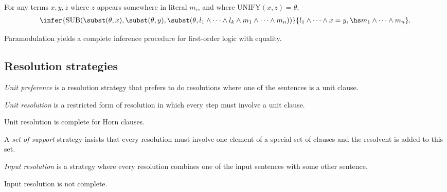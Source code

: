 \documentclass{article}
\begin{document}
\begin{definition}[Paramodulation]
    For any terms $x,y,z$ where $z$ appears somewhere in literal $m_i$,
    and where $\text{UNIFY}(x,z)=\theta$,
    \begin{align*}
        \infer{
            \text{SUB}(\subst(\theta,x),\subst(\theta,y),\subst(\theta,l_1\wedge\cdots\wedge l_k\wedge m_1\wedge\cdots\wedge m_n))
        }{
            l_1\wedge \cdots\wedge x=y,\hs m_1\wedge\cdots\wedge m_n
        }.
    \end{align*} 
\end{definition}

\begin{theorem}
    Paramodulation yields a complete inference procedure for first-order logic
    with equality.
\end{theorem}

\subsection{Resolution strategies}

\begin{definition}
    \emph{Unit preference} is a resolution strategy that prefers to do resolutions
    where one of the sentences is a unit clause.
\end{definition}

\begin{definition}
    \emph{Unit resolution} is a restricted form of resolution in which every
    step must involve a unit clause.
\end{definition}

\begin{theorem}
    Unit resolution is complete for Horn clauses.
\end{theorem}

\begin{definition}
    A \emph{set of support} strategy insists that every resolution must
    involve one element of a special set of clauses and the resolvent is
    added to this set.
\end{definition}

\begin{definition}
    \emph{Input resolution} is a strategy where every resolution combines
    one of the input sentences with some other sentence.
\end{definition}

\begin{theorem}
    Input resolution is not complete.
\end{theorem}
\end{document}
